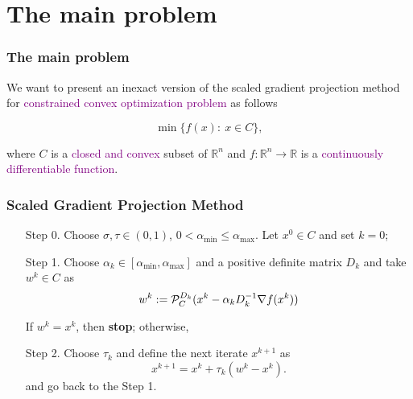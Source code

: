 \section{The main problem}


\begin{frame}
  \frametitle[c]{The main problem}

  We want to present an inexact version of the scaled gradient projection method  for  \textcolor{purple}{constrained convex optimization problem} as follows

  \bigskip

  \begin{equation} \label{eq:OptP}
    \min \{ f(x) :~   x\in C\},
  \end{equation}

  \bigskip

  where $C$ is a \textcolor{purple}{closed and convex} subset of $\mathbb{R}^n$ and $f:\mathbb{R}^n \to \mathbb{R}$ is a \textcolor{purple}{continuously differentiable function}.
\end{frame}


\begin{frame}
  \frametitle{Scaled Gradient Projection Method}

  \begin{enumerate}
    \item[Step 0.] Choose  $\sigma, \tau \in (0, 1)$, $0 < \alpha_{\min} \leq \alpha_{\max}$. Let $x^0\in C$ and set $k=0$;

    \item[Step 1.] Choose $\alpha_k\in [\alpha_{\min}, \alpha_{\max}]$ and a positive definite matrix $D_k$ and take  $w^{k}\in C$  as
      \begin{equation*}
        w^k := {\cal P}_{C}^{D_k} (x^{k}-\alpha_k D_k^{-1}\nabla f(x^{k}))
      \end{equation*}

      If $w^k= x^k$, then {\bf stop}; otherwise,
    \item [Step 2.] Choose $\tau_k$ and define the next iterate $x^{k+1}$ as
          \begin{equation} \label{eq:IterArm}
            x^{k+1} = x^{k} + \tau_k (w^k - x^{k}).
          \end{equation}
          and go back to the Step 1.
  \end{enumerate}
\end{frame}


